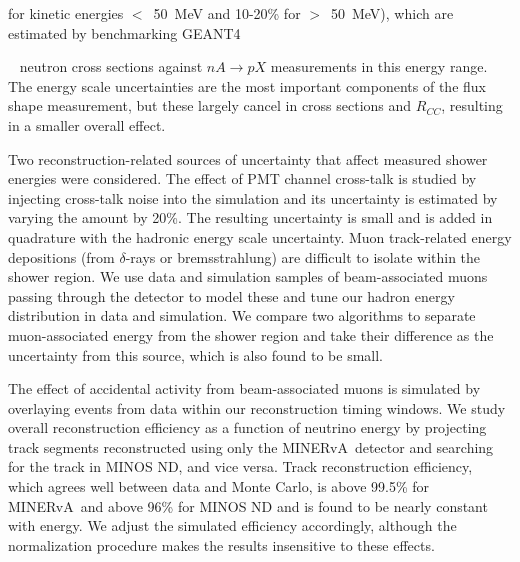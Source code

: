 \documentclass[aps,preprint,showpacs,superscriptaddress,linenumbers,nofootinbib,prd,12pt]{revtex4}
\newcommand{\minerva}{MINERvA\xspace}
\newcommand{\ratio}{\ensuremath{R_{CC}}}
\begin{document}
for kinetic energies $<$~50~MeV and 10-20\% for $>$~50~MeV), which are estimated by benchmarking GEANT4{~\cite{Agostinelli:2002hh} 
neutron cross sections against $nA\rightarrow pX$ measurements in this energy range. 
The energy scale uncertainties are the most important components of the flux shape measurement, but these largely cancel in cross sections and \ratio{}, resulting in a smaller overall effect.

Two reconstruction-related sources of uncertainty that affect measured shower energies were considered. The effect of PMT channel cross-talk is studied  by injecting cross-talk noise into the simulation and its uncertainty is estimated by varying the amount by 20\%. The resulting uncertainty is small and is added in quadrature with the hadronic energy scale uncertainty.  Muon track-related energy depositions (from $\delta$-rays or bremsstrahlung) are difficult to isolate within the shower region. We use data and simulation samples of beam-associated muons passing through the detector to model these and tune our hadron energy distribution in data and simulation. We compare two algorithms to separate muon-associated energy from the shower region and take their difference as the uncertainty from this source, which is also found to be small.

The effect of accidental activity from beam-associated  muons is simulated by overlaying events from data within our reconstruction timing windows. 
We study overall reconstruction efficiency as a function of neutrino energy by projecting track segments reconstructed using only the \minerva\ detector and searching for the track in MINOS ND, and vice versa.
Track reconstruction efficiency, which agrees well between data and Monte Carlo, is above 99.5\%  for \minerva\ and above 96\%
for MINOS ND and is 
found to be nearly constant
with energy. We adjust the simulated efficiency accordingly, although the
normalization procedure makes the results insensitive to these effects.

}
\end{document}
